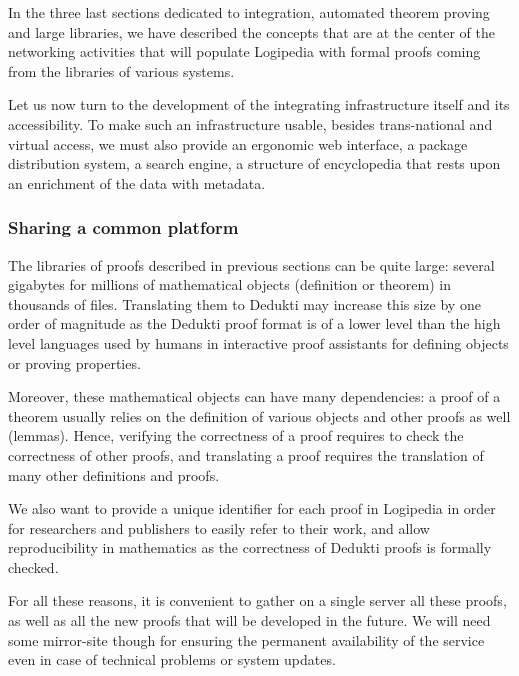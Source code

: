 
In the three last sections dedicated to integration, automated theorem
proving and large libraries, we have described the concepts that are
at the center of the networking activities that will populate
Logipedia with formal proofs coming from the libraries of various
systems.

Let us now turn to the development of the integrating infrastructure
itself and its accessibility.
To make such an infrastructure
usable, besides trans-national and virtual access,
we must also provide an ergonomic web interface, a package
distribution system, a search engine, a structure of encyclopedia
that rests upon an enrichment of the data with metadata.

\subsubsection*{Sharing a common platform}

The libraries of proofs described in previous sections can be quite
large: several gigabytes for millions of mathematical objects
(definition or theorem) in thousands of files. Translating them to
Dedukti may increase this size by one order of magnitude as the
Dedukti proof format is of a lower level than the high level languages
used by humans in interactive proof assistants for defining objects or
proving properties.

Moreover, these mathematical objects can have many dependencies: a
proof of a theorem usually relies on the definition of various objects
and other proofs as well (lemmas). Hence, verifying the correctness of
a proof requires to check the correctness of other proofs, and
translating a proof requires the translation of many other definitions
and proofs.

We also want to provide a unique identifier for each proof in
Logipedia in order for researchers and publishers to easily refer to
their work, and allow reproducibility in mathematics as the
correctness of Dedukti proofs is formally checked.

For all these reasons, it is convenient to gather on a single server
all these proofs, as well as all the new proofs that will be developed
in the future. We will need some mirror-site though for ensuring the
permanent availability of the service even in case of technical
problems or system updates.

